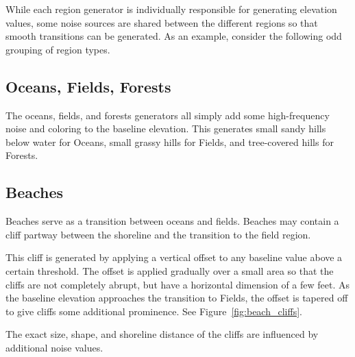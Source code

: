 While each region generator is individually responsible for generating elevation values, some noise sources are shared between the different regions so that smooth transitions can be generated.
As an example, consider the following odd grouping of region types.

\subsection{Oceans, Fields, Forests}

The oceans, fields, and forests generators all simply add some high-frequency noise and coloring to the baseline elevation.
This generates small sandy hills below water for Oceans, small grassy hills for Fields, and tree-covered hills for Forests.

\subsection{Beaches}

Beaches serve as a transition between oceans and fields.
Beaches may contain a cliff partway between the shoreline and the transition to the field region.

This cliff is generated by applying a vertical offset to any baseline value above a certain threshold.
The offset is applied gradually over a small area so that the cliffs are not completely abrupt, but have a horizontal dimension of a few feet.
As the baseline elevation approaches the transition to Fields, the offset is tapered off to give cliffs some additional prominence.
See Figure~\ref{fig:beach_cliffs}.

The exact size, shape, and shoreline distance of the cliffs are influenced by additional noise values.

